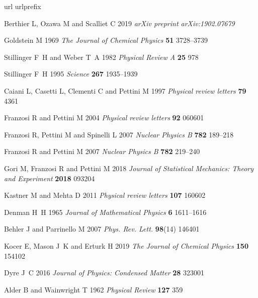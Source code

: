\documentclass[default,iicol]{sn-jnl}%
\theoremstyle{thmstyleone}%
\theoremstyle{thmstyletwo}%
\theoremstyle{thmstylethree}%
\begin{document}
\providecommand{\newblock}{}
\begin{thebibliography}{10}
	\expandafter\ifx\csname url\endcsname\relax
	\def\url#1{{\tt #1}}\fi
	\expandafter\ifx\csname urlprefix\endcsname\relax\def\urlprefix{URL }\fi
	\providecommand{\eprint}[2][]{\url{#2}}
	
	Berthier L, Ozawa M and Scalliet C 2019 {\em arXiv preprint arXiv:1902.07679\/}
	
	Goldstein M 1969 {\em The Journal of Chemical Physics\/} {\bf 51} 3728–3739
	
	Stillinger F~H and Weber T~A 1982 {\em Physical Review A\/} {\bf 25} 978
	
	Stillinger F~H 1995 {\em Science\/} {\bf 267} 1935–1939
	
	Caiani L, Casetti L, Clementi C and Pettini M 1997 {\em Physical review
		letters\/} {\bf 79} 4361
	
	Franzosi R and Pettini M 2004 {\em Physical review letters\/} {\bf 92} 060601
	
	Franzosi R, Pettini M and Spinelli L 2007 {\em Nuclear Physics B\/} {\bf 782}
	189–218
	
	Franzosi R and Pettini M 2007 {\em Nuclear Physics B\/} {\bf 782} 219–240
	
	Gori M, Franzosi R and Pettini M 2018 {\em Journal of Statistical Mechanics:
		Theory and Experiment\/} {\bf 2018} 093204
	
	Kastner M and Mehta D 2011 {\em Physical review letters\/} {\bf 107} 160602
	
	Denman H~H 1965 {\em Journal of Mathematical Physics\/} {\bf 6} 1611–1616
	
	Behler J and Parrinello M 2007 {\em Phys. Rev. Lett.\/} {\bf 98}(14) 146401
	
	Kocer E, Mason J~K and Erturk H 2019 {\em The Journal of Chemical Physics\/}
	{\bf 150} 154102
	
	Dyre J~C 2016 {\em Journal of Physics: Condensed Matter\/} {\bf 28} 323001
	
	Alder B and Wainwright T 1962 {\em Physical Review\/} {\bf 127} 359
	

\end{thebibliography}
\end{document}
